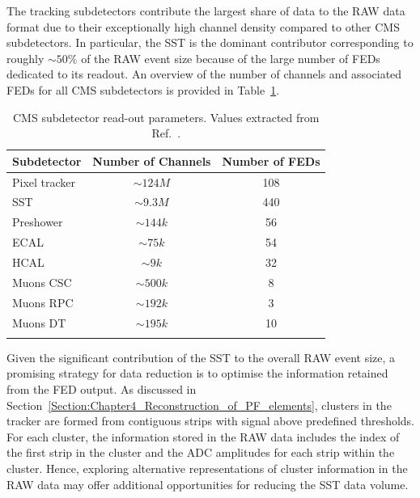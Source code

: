 The tracking subdetectors contribute the largest share of data to the RAW data format due to their exceptionally high channel density compared to other \ac{CMS} subdetectors. In particular, the \ac{SST} is the dominant contributor corresponding to roughly $\sim 50\%$ of the RAW event size because of the large number of FEDs dedicated to its readout. An overview of the number of channels and associated FEDs for all \ac{CMS} subdetectors is provided in Table~\ref{Table:Chapter4_RAW_Channels_FED}.

\begin{table}[htbp]
\centering
\renewcommand{\arraystretch}{1.5} %
\begin{tabular}{|l|c|c|}
\hline
Subdetector & Number of Channels & Number of FEDs \\
\hline \hline
Pixel tracker & $\sim124\unit{M}$ & 108 \\
\arrayrulecolor{lightgray} \hline
\ac{SST} & $\sim9.3\unit{M}$ & 440 \\
\arrayrulecolor{lightgray} \hline
Preshower & $\sim144\unit{k}$ & 56 \\
\arrayrulecolor{lightgray} \hline
\ac{ECAL} & $\sim75\unit{k}$ & 54 \\
\arrayrulecolor{lightgray} \hline
\ac{HCAL} & $\sim9\unit{k}$ & 32 \\
\arrayrulecolor{lightgray} \hline
Muons \ac{CSC} & $\sim500\unit{k}$ & 8 \\
\arrayrulecolor{lightgray} \hline
Muons \ac{RPC} & $\sim192\unit{k}$ & 3 \\
\arrayrulecolor{lightgray} \hline
Muons \ac{DT} & $\sim195\unit{k}$ & 10 \\
\arrayrulecolor{lightgray} \hline
\arrayrulecolor{black} \hline
\end{tabular}
\caption[CMS subdetector read-out parameters]{\ac{CMS} subdetector read-out parameters. Values extracted from Ref.~\cite{LHC_CMS,CMS_Tracker_Phase1_Upgrade_2}.}
\label{Table:Chapter4_RAW_Channels_FED}
\end{table}

Given the significant contribution of the \ac{SST} to the overall RAW event size, a promising strategy for data reduction is to optimise the information retained from the FED output. As discussed in Section~\ref{Section:Chapter4_Reconstruction_of_PF_elements}, clusters in the tracker are formed from contiguous strips with signal above predefined thresholds. For each cluster, the information stored in the RAW data includes the index of the first strip in the cluster and the ADC amplitudes for each strip within the cluster. Hence, exploring alternative representations of cluster information in the RAW data may offer additional opportunities for reducing the \ac{SST} data volume.

